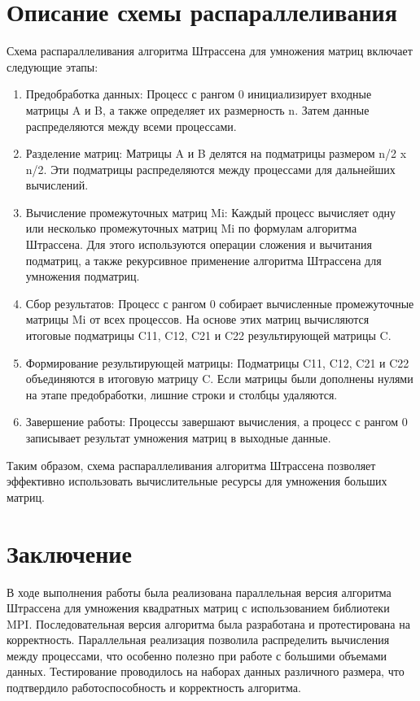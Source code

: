 \documentclass[a4paper,12pt]{article}
\begin{document}
\section{Описание схемы распараллеливания}

Схема распараллеливания алгоритма Штрассена для умножения матриц включает следующие этапы:

\begin{enumerate}
\item Предобработка данных: Процесс с рангом 0 инициализирует входные матрицы A и B, а также определяет их размерность n. Затем данные распределяются между всеми процессами.

\item Разделение матриц: Матрицы A и B делятся на подматрицы размером n/2 x n/2. Эти подматрицы распределяются между процессами для дальнейших вычислений.

\item Вычисление промежуточных матриц Mi: Каждый процесс вычисляет одну или несколько промежуточных матриц Mi по формулам алгоритма Штрассена. Для этого используются операции сложения и вычитания подматриц, а также рекурсивное применение алгоритма Штрассена для умножения подматриц.

\item Сбор результатов: Процесс с рангом 0 собирает вычисленные промежуточные матрицы Mi от всех процессов. На основе этих матриц вычисляются итоговые подматрицы C11, C12, C21 и C22 результирующей матрицы C.

\item Формирование результирующей матрицы: Подматрицы C11, C12, C21 и C22 объединяются в итоговую матрицу C. Если матрицы были дополнены нулями на этапе предобработки, лишние строки и столбцы удаляются.

\item Завершение работы: Процессы завершают вычисления, а процесс с рангом 0 записывает результат умножения матриц в выходные данные.
\end{enumerate}

Таким образом, схема распараллеливания алгоритма Штрассена позволяет эффективно использовать вычислительные ресурсы для умножения больших матриц.

\section{Заключение}

В ходе выполнения работы была реализована параллельная версия алгоритма Штрассена для умножения квадратных матриц с использованием библиотеки MPI. Последовательная версия алгоритма была разработана и протестирована на корректность. Параллельная реализация позволила распределить вычисления между процессами, что особенно полезно при работе с большими объемами данных. Тестирование проводилось на наборах данных различного размера, что подтвердило работоспособность и корректность алгоритма.
\end{document}
